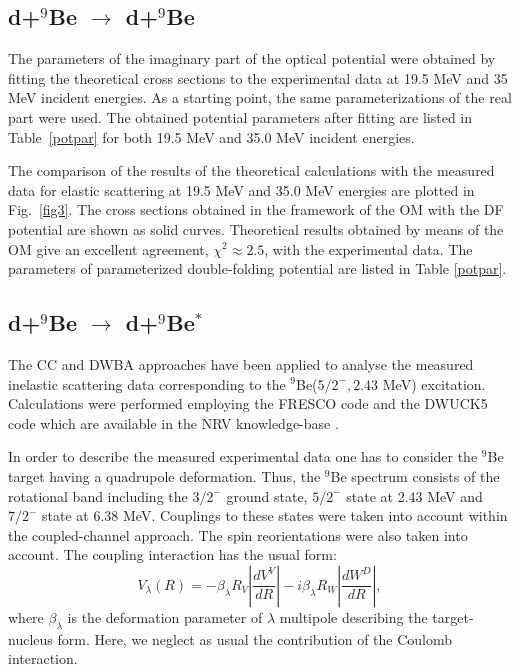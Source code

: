 \documentclass[
11pt, %
english, %
onehalfspacing, %
headsepline, %
]{MastersDoctoralThesis} %
\begin{document}
\subsection{d+$^9$Be $\rightarrow$ d+$^9$Be}
The parameters of the imaginary part of the optical potential were obtained by fitting the theoretical cross sections to the experimental data at 19.5 MeV and 35 MeV incident energies. As a starting point, the same parameterizations of the real part were used. The obtained potential parameters after fitting are listed in Table~\ref{potpar} for both 19.5 MeV and 35.0 MeV incident energies.

The comparison of the results of the theoretical calculations with  the measured data for elastic scattering at 19.5 MeV and 35.0 MeV energies are plotted in Fig.~\ref{fig3}. 
The cross sections obtained in the framework of the OM with the DF potential are shown as solid curves. 
Theoretical results obtained by means of the OM give an excellent agreement, $\chi^2\approx2.5$, with the experimental data. The  parameters of  parameterized double-folding potential are listed in Table \ref{potpar}. 

\subsection{d+$^9$Be $\rightarrow$ d+$^9$Be$^*$}

The CC and DWBA approaches have been applied to analyse the measured inelastic scattering data corresponding to the ${}^9$Be($5/2^-, 2.43$ MeV) excitation. Calculations were performed employing the FRESCO code \cite{fresco} and the DWUCK5 code \cite{kunz} which are available in the NRV knowledge-base \cite{nrv}.

In order to describe the measured experimental data one has to consider the ${}^9$Be target having a quadrupole deformation. Thus, the ${}^9$Be spectrum consists of the rotational band including the  $3/2^-$ ground state, $5/2^-$ state at 2.43 MeV and $7/2^-$ state at 6.38 MeV. Couplings to these states were taken into account within the coupled-channel approach. The spin reorientations were also taken into account. The coupling interaction has the usual form:
\begin{equation}
V_\lambda(R)=-\beta_\lambda R_V \left|\frac{d V^V}{dR}\right| - i \beta_\lambda R_W \left|\frac{d W^D}{dR}\right|,
\end{equation}
where $\beta_\lambda$ is the deformation parameter of $\lambda$ multipole describing the target-nucleus form. Here, we neglect as usual the contribution of the Coulomb interaction.
\end{document}
